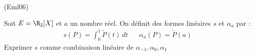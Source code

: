 \begin{tiny}(Eml06)\end{tiny}
Soit $E=\R_{2}[X]$ et $a$ un nombre r{\'e}el. On définit des formes linéaires $s$ et $\alpha_{a}$ par :
\begin{align*}
 s(P)=\int_{0}^{1}\tilde{P}(t)\,dt & & \alpha_{a}(P)=\tilde{P}(a)
\end{align*}
Exprimer $s$ comme combinaison linéaire de $\alpha_{-1},\alpha_0,\alpha_1$
